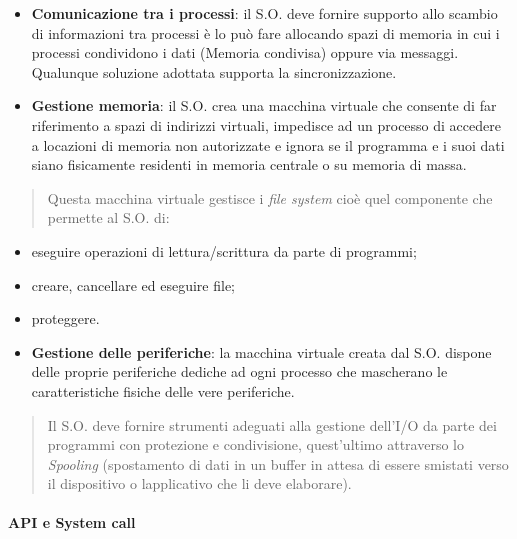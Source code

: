 \begin{itemize}
\item
  \textbf{Comunicazione tra i processi}: il S.O. deve fornire supporto
  allo scambio di informazioni tra processi è lo può fare allocando
  spazi di memoria in cui i processi condividono i dati (Memoria
  condivisa) oppure via messaggi. Qualunque soluzione adottata supporta
  la sincronizzazione.
\item
  \textbf{Gestione memoria}: il S.O. crea una macchina virtuale che
  consente di far riferimento a spazi di indirizzi virtuali, impedisce
  ad un processo di accedere a locazioni di memoria non autorizzate e
  ignora se il programma e i suoi dati siano fisicamente residenti in
  memoria centrale o su memoria di massa.
\end{itemize}

\begin{quote}
Questa macchina virtuale gestisce i \emph{file system} cioè quel
componente che permette al S.O. di:
\end{quote}

\begin{itemize}
\item
  eseguire operazioni di lettura/scrittura da parte di programmi;
\item
  creare, cancellare ed eseguire file;
\item
  proteggere.
\end{itemize}

\begin{itemize}
\item
  \textbf{Gestione delle periferiche}: la macchina virtuale creata dal
  S.O. dispone delle proprie periferiche dediche ad ogni processo che
  mascherano le caratteristiche fisiche delle vere periferiche.
\end{itemize}

\begin{quote}
Il S.O. deve fornire strumenti adeguati alla gestione dell'I/O da parte
dei programmi con protezione e condivisione, quest'ultimo attraverso lo
\emph{Spooling} (spostamento di dati in un buffer in attesa di essere
smistati verso il dispositivo o l\textquotesingle applicativo che li
deve elaborare).
\end{quote}

\paragraph{API e System call}\label{api-e-system-call}

